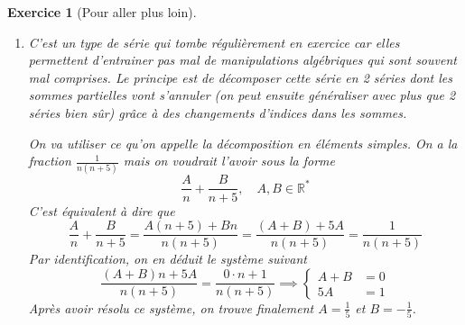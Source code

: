 \documentclass[11.5pt,french,table]{article}
\newcommand{\enumeratelinefix}{\leavevmode \vspace{-\baselineskip}} %
\theoremstyle{exercice}
\newtheorem{exercice}{Exercice}
\begin{document}
\begin{exercice}[Pour aller plus loin]
\enumeratelinefix
\begin{enumerate}

    \item C'est un type de série qui tombe régulièrement en exercice car elles permettent d'entrainer pas mal de manipulations algébriques qui sont souvent mal comprises. \emph{Le principe est de décomposer cette série en 2 séries dont les sommes partielles vont s'annuler} (on peut ensuite généraliser avec plus que 2 séries bien sûr) grâce à des changements d'indices dans les sommes.
    
    On va utiliser ce qu'on appelle la décomposition en éléments simples. On a la fraction $\frac{1}{n(n+5)}$ mais on voudrait l'avoir sous la forme
    \[
         \frac{A}{n} + \frac{B}{n+5}, \quad A,B \in \mathbb{R}^{*}
    \]
    C'est équivalent à dire que
    \[
        \frac{A}{n} + \frac{B}{n+5} = \frac{A(n+5) + Bn}{n(n+5)} = \frac{(A + B) + 5A}{n(n+5)} = \frac{1}{n(n+5)}
    \]
    Par identification, on en déduit le système suivant
    \[
       \frac{(A + B)n + 5A}{n(n+5)} = \frac{0 \cdot n + 1}{n(n+5)} \implies \begin{cases}
       A + B & = 0 \\
       5A & = 1
       \end{cases}
    \]
    Après avoir résolu ce système, on trouve finalement $A = \frac{1}{5}$ et $B = -\frac{1}{5}$.
    

\end{enumerate}
\end{exercice}
\end{document}
